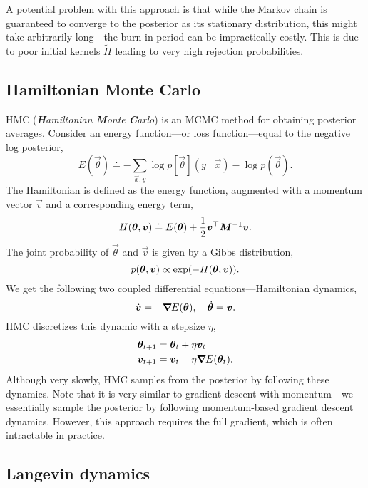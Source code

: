 A potential problem with this approach is that while the Markov chain is guaranteed to converge to
the posterior as its stationary distribution, this might take arbitrarily long---the burn-in period
can be impractically costly. This is due to poor initial kernels $\tilde{\Pi}$ leading to very high
rejection probabilities.

\subsection{Hamiltonian Monte Carlo}

HMC (\textit{\textbf{H}amiltonian \textbf{M}onte \textbf{C}arlo}) is an MCMC method for obtaining
posterior averages. Consider an energy function---or loss function---equal to the negative log
posterior, \[
    E(\vec{\theta}) \doteq -\sum_{\vec{x}, y} \log p[\vec{\theta}](y \mid \vec{x}) - \log p(\vec{\theta}).
\]
The Hamiltonian is defined as the energy function, augmented with a momentum vector $\vec{v}$ and a
corresponding energy term, \[
    H(\bm{\theta}, \bm{v}) \doteq E(\bm{\theta}) + \frac{1}{2} \bm{v}^\top\bm{M}^{-1} \bm{v}.
\]
The joint probability of $\vec{\theta}$ and $\vec{v}$ is given by a Gibbs distribution, \[
    p(\vec{\theta}, \vec{v}) \propto \exp \lft( -H(\vec{\theta}, \vec{v}) \rgt).
\]
We get the following two coupled differential equations---Hamiltonian dynamics, \[
    \dot{\bm{v}} = -\bm{\nabla}_{\! } E(\bm{\theta}), \quad \dot{\bm{\theta}} = \bm{v}.
\]
HMC discretizes this dynamic with a stepsize $\eta$,
\begin{align*}
    \bm{\theta}_{t+1} & = \bm{\theta}_t + \eta \bm{v}_t              \\
    \bm{v}_{t+1}      & = \bm{v}_t - \eta \bm{\nabla}_{\! } E(\bm{\theta}_t).
\end{align*}
Although very slowly, HMC samples from the posterior by following these dynamics. Note that it is
very similar to gradient descent with momentum---we essentially sample the posterior by following
momentum-based gradient descent dynamics. However, this approach requires the full
gradient, which is often intractable in practice.

\subsection{Langevin dynamics}


